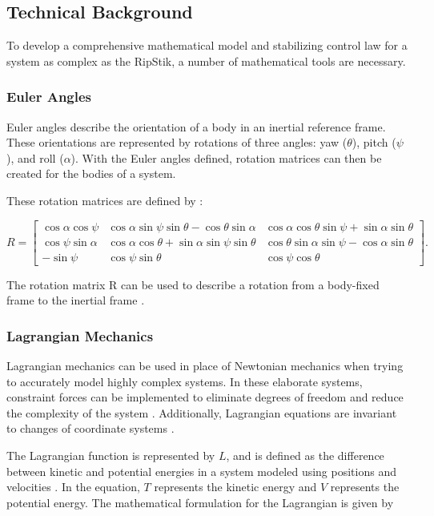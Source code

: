 \subsection{Technical Background}
To develop a comprehensive mathematical model and stabilizing control law for a system as complex as the RipStik, a number of mathematical tools are necessary.

\subsubsection{Euler Angles}

Euler angles describe the orientation of a body in an inertial reference frame.
These orientations are represented by rotations of three angles: yaw ($\theta$), pitch ($\psi$), and roll ($\alpha$).
With the Euler angles defined, rotation matrices can then be created for the bodies of a system.

These rotation matrices are defined by \cite{Lewis}:

\begin{equation}
\label{eq:RotM}
R =
\begin{bmatrix} 
\cos\alpha\cos\psi & \cos\alpha\sin\psi\sin\theta - \cos\theta\sin\alpha &\cos\alpha\cos\theta\sin\psi+\sin\alpha\sin\theta\\
\cos\psi\sin\alpha & \cos\alpha\cos\theta+\sin\alpha\sin\psi\sin\theta & \cos\theta\sin\alpha\sin\psi - \cos\alpha\sin\theta\\
-\sin\psi & \cos\psi\sin\theta & \cos\psi\cos\theta 
\end{bmatrix}.
\end{equation}

The rotation matrix R can be used to describe a rotation from a body-fixed frame to the inertial frame \cite{VTOL}.

\subsubsection{Lagrangian Mechanics}

Lagrangian mechanics can be used in place of Newtonian mechanics when trying to accurately model highly complex systems.
In these elaborate systems, constraint forces can be implemented to eliminate degrees of freedom and reduce the complexity of the system \cite{LagrangeEquations}. 
Additionally, Lagrangian equations are invariant to changes of coordinate systems \cite{LagrangePowerpoint}.

The Lagrangian function is represented by $L$, and is defined as the difference between kinetic and potential energies in a system modeled using positions and velocities \cite{NonholonomicPowerpoint}.
In the equation, $T$ represents the kinetic energy and $V$ represents the potential energy.
The mathematical formulation for the Lagrangian is given by

